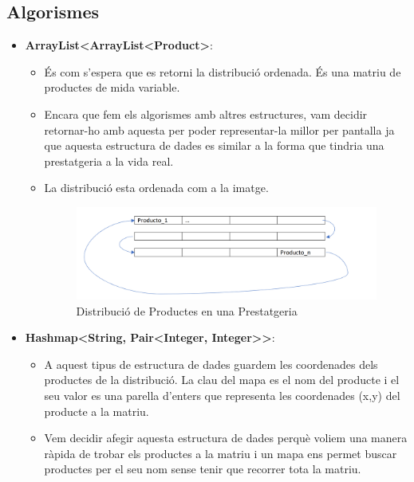 \documentclass[a4paper, t]{article}
\begin{document}
\newpage
\subsection{Algorismes}
\begin{itemize}
    \item \textbf{ArrayList\textless ArrayList\textless Product\textgreater}: 
    \begin{itemize}
        \item És com s’espera que es retorni la distribució ordenada. És una matriu de productes de mida variable. 
        \item Encara que fem els algorismes amb altres estructures, vam decidir retornar-ho amb aquesta per poder representar-la millor per pantalla ja que aquesta estructura de dades es similar a la forma que tindria una prestatgeria a la vida real.  
        \item La distribució esta ordenada com a la imatge.
        \begin{figure}[H]
            \centering
            \includegraphics[width=\textwidth]{img/DistributionShelf.png}
            \caption{Distribució de Productes en una Prestatgeria}
            \label{fig:distributionshelf}
        \end{figure}
    \end{itemize}
     \item \textbf{Hashmap\textless String, Pair\textless Integer, Integer\textgreater \textgreater}: 
    \begin{itemize}
        \item A aquest tipus de estructura de dades guardem les coordenades dels productes de la distribució. La clau del mapa es el nom del producte i el seu valor es una parella d’enters que representa les coordenades (x,y) del producte a la matriu. 

        \item Vem decidir afegir aquesta estructura de dades perquè voliem una manera ràpida de trobar els productes a la matriu i un mapa ens permet buscar productes per el seu nom sense tenir que recorrer tota la matriu.
        

\end{itemize}
\end{itemize}
\end{document}
